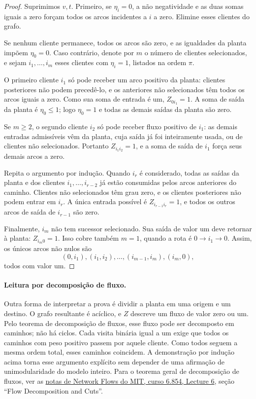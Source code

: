 \documentclass[11pt,a4paper]{article}
\begin{document}
\begin{proof}
Suprimimos $v,t$. Primeiro, se $\eta_i=0$, a não negatividade e as duas somas iguais a zero forçam todos os arcos incidentes a $i$ a zero. Elimine esses clientes do grafo.

Se nenhum cliente permanece, todos os arcos são zero, e as igualdades da planta impõem $\eta_0=0$. Caso contrário, denote por $m$ o número de clientes selecionados, e sejam $i_1,\ldots,i_m$ esses clientes com $\eta_i=1$, listados na ordem $\pi$.

O primeiro cliente $i_1$ só pode receber um arco positivo da planta: clientes posteriores não podem precedê-lo, e os anteriores não selecionados têm todos os arcos iguais a zero. Como sua soma de entrada é um, $Z_{0i_1}=1$. A soma de saída da planta é $\eta_0\le1$; logo $\eta_0=1$ e todas as demais saídas da planta são zero.

Se $m\ge2$, o segundo cliente $i_2$ só pode receber fluxo positivo de $i_1$: as demais entradas admissíveis vêm da planta, cuja saída já foi inteiramente usada, ou de clientes não selecionados. Portanto $Z_{i_1i_2}=1$, e a soma de saída de $i_1$ força seus demais arcos a zero.

Repita o argumento por indução. Quando $i_r$ é considerado, todas as saídas da planta e dos clientes $i_1,\ldots,i_{r-2}$ já estão consumidas pelos arcos anteriores do caminho. Clientes não selecionados têm grau zero, e os clientes posteriores não podem entrar em $i_r$. A única entrada possível é $Z_{i_{r-1}i_r}=1$, e todos os outros arcos de saída de $i_{r-1}$ são zero.

Finalmente, $i_m$ não tem sucessor selecionado. Sua saída de valor um deve retornar à planta: $Z_{i_m0}=1$. Isso cobre também $m=1$, quando a rota é $0\to i_1\to0$. Assim, os únicos arcos não nulos são
\[
 (0,i_1),(i_1,i_2),\ldots,(i_{m-1},i_m),(i_m,0),
\]
todos com valor um.
\end{proof}

\paragraph{Leitura por decomposição de fluxo.} Outra forma de interpretar a prova é dividir a planta em uma origem e um destino. O grafo resultante é acíclico, e $Z$ descreve um fluxo de valor zero ou um. Pelo teorema de decomposição de fluxos, esse fluxo pode ser decomposto em caminhos; não há ciclos. Cada visita binária igual a um exige que todos os caminhos com peso positivo passem por aquele cliente. Como todos seguem a mesma ordem total, esses caminhos coincidem. A demonstração por indução acima torna esse argumento explícito sem depender de uma afirmação de unimodularidade do modelo inteiro. Para o teorema geral de decomposição de fluxos, ver as \href{https://courses.csail.mit.edu/6.854/19/Scribe/s6-maxflow/s6-maxflow.html}{notas de Network Flows do MIT, curso 6.854, Lecture 6}, seção ``Flow Decomposition and Cuts''.
\end{document}
